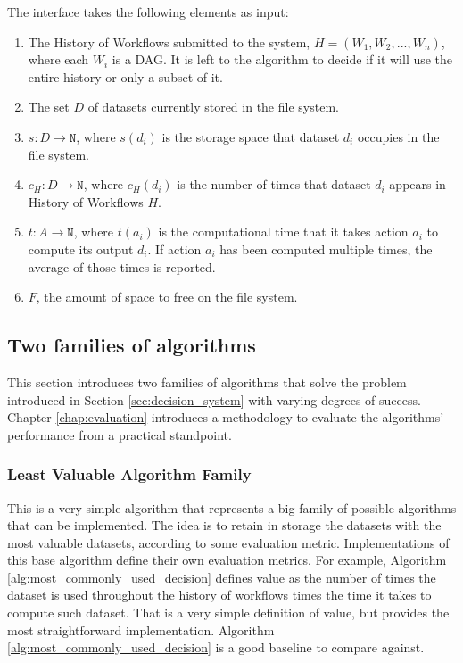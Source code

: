 The interface takes the following elements as input:

\begin{enumerate}
\item The History of Workflows submitted to the system, $H = (W_1, W_2, ..., W_n)$, where each $W_i$ is a DAG. It is left to the algorithm to decide if it will use the entire history or only a subset of it.

\item The set $D$ of datasets currently stored in the file system. 

\item $s: D \to \mathtt{N} $, where $s(d_i)$ is the storage space that dataset $d_i$ occupies in the file system.

\item $c_H: D \to \mathtt{N}$, where $c_H(d_i)$ is the number of times that dataset $d_i$ appears in History of Workflows $H$.

\item $t: A \to \mathtt{N}$, where $t(a_i)$ is the computational time that it takes action $a_i$ to compute its output $d_i$.  If action $a_i$ has been computed multiple times, the average of those times is reported.

\item $F$, the amount of space to free on the file system.

\end{enumerate}

\subsection{Two families of algorithms}
This section introduces two families of algorithms that solve the problem introduced in Section \ref{sec:decision_system} with varying degrees of success. Chapter \ref{chap:evaluation} introduces a methodology to evaluate the algorithms' performance from a practical standpoint.

\subsubsection{Least Valuable Algorithm Family}
This is a very simple algorithm that represents a big family of possible algorithms that can be implemented.  The idea is to retain in storage the datasets with the most valuable datasets, according to some evaluation metric. Implementations of this base algorithm define their own evaluation metrics.  For example, Algorithm \ref{alg:most_commonly_used_decision} defines value as the number of times the dataset is used throughout the history of workflows times the time it takes to compute such dataset. That is a very simple definition of value, but provides the most straightforward implementation.  Algorithm \ref{alg:most_commonly_used_decision} is a good baseline to compare against.

